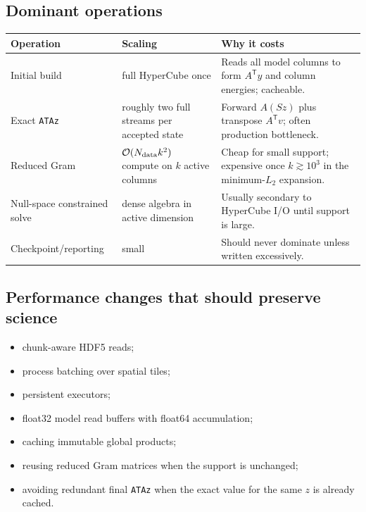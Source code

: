 \documentclass[10pt,a4paper]{article}
\newcommand{\code}[1]{\texttt{#1}}
\begin{document}
\subsection{Dominant operations}
\begin{longtable}{p{}p{}p{}}
\toprule
\textbf{Operation} & \textbf{Scaling} & \textbf{Why it costs}\\
\midrule\endhead
Initial build & full HyperCube once & Reads all model columns to form $A^{\mathsf T}y$ and column energies; cacheable.\\
Exact \code{ATAz} & roughly two full streams per accepted state & Forward $A(Sz)$ plus transpose $A^{\mathsf T}v$; often production bottleneck.\\
Reduced Gram & $\mathcal{O}(N_{\rm data}k^2)$ compute on $k$ active columns & Cheap for small support; expensive once $k\gtrsim10^3$ in the minimum-$L_2$ expansion.\\
Null-space constrained solve & dense algebra in active dimension & Usually secondary to HyperCube I/O until support is large.\\
Checkpoint/reporting & small & Should never dominate unless written excessively.\\
\bottomrule
\end{longtable}

\subsection{Performance changes that should preserve science}
\begin{itemize}
\item chunk-aware HDF5 reads;
\item process batching over spatial tiles;
\item persistent executors;
\item float32 model read buffers with float64 accumulation;
\item caching immutable global products;
\item reusing reduced Gram matrices when the support is unchanged;
\item avoiding redundant final \code{ATAz} when the exact value for the same $z$ is already cached.
\end{itemize}
\end{document}
